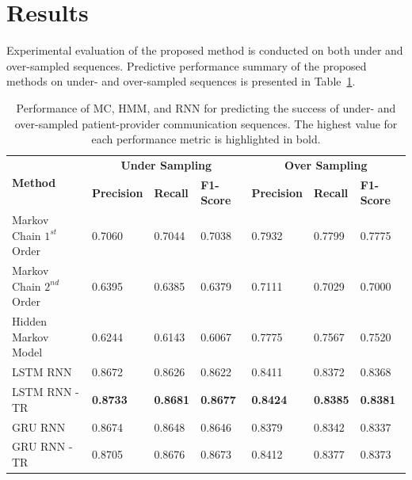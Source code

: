 \documentclass{amia_summit_2018}
\begin{document}
\section*{Results}
Experimental evaluation of the proposed method is conducted on both under and over-sampled sequences. Predictive performance summary of the proposed methods on under- and over-sampled sequences is presented in Table~\ref{tab:result_under_over_sampled}.\\ 
\begin{table}[h]
\centering
\caption{Performance of MC, HMM, and RNN for predicting the success of under- and over-sampled patient-provider communication sequences. The highest value for each performance metric is highlighted in bold.}
\label{tab:result_under_over_sampled}
  \begin{tabular}{|l|l|l|l|l|l|l|}
  \hline
   \multirow{2}{*}{\textbf{Method}} & \multicolumn{3}{|c|}{\textbf{Under Sampling}} & \multicolumn{3}{|c|}{\textbf{Over Sampling}} \\\cline{2-7}
   & \textbf{Precision}  & \textbf{Recall} & \textbf{F1-Score} & \textbf{Precision}  & \textbf{Recall} & \textbf{F1-Score}\\ \hline    
    
 Markov Chain $1^{st}$ Order & 0.7060 & 0.7044 & 0.7038 & 0.7932 & 0.7799 & 0.7775 \\ \hline
 Markov Chain $2^{nd}$ Order & 0.6395 & 0.6385 & 0.6379 & 0.7111 & 0.7029 & 0.7000\\ \hline
 Hidden Markov Model & 0.6244 & 0.6143 & 0.6067 & 0.7775 & 0.7567 & 0.7520\\ \hline
 LSTM RNN & 0.8672 & 0.8626 & 0.8622 & 0.8411 & 0.8372 & 0.8368\\ \hline
 LSTM RNN - TR & \textbf{0.8733} & \textbf{0.8681} & \textbf{0.8677} & \textbf{0.8424} & \textbf{0.8385} & \textbf{0.8381}\\ \hline
 GRU RNN & 0.8674 & 0.8648 & 0.8646 & 0.8379 & 0.8342 & 0.8337\\ \hline
 GRU RNN - TR & 0.8705 & 0.8676 & 0.8673 & 0.8412 & 0.8377 & 0.8373\\ \hline 
  \end{tabular}
\end{table}  
\end{document}
